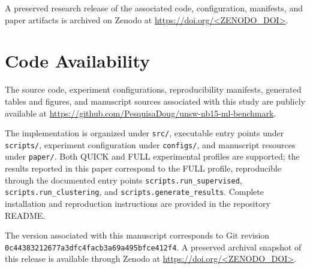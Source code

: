 \documentclass[conference]{IEEEtran}
\begin{document}
A preserved research release of the associated code, configuration, manifests, and paper artifacts is archived on Zenodo at \url{https://doi.org/<ZENODO_DOI>}.

\section{Code Availability}
The source code, experiment configurations, reproducibility manifests, generated tables and figures, and manuscript sources associated with this study are publicly available at \url{https://github.com/PesquisaDoug/unsw-nb15-ml-benchmark}.

The implementation is organized under \texttt{src/}, executable entry points under \texttt{scripts/}, experiment configuration under \texttt{configs/}, and manuscript resources under \texttt{paper/}. Both QUICK and FULL experimental profiles are supported; the results reported in this paper correspond to the FULL profile, reproducible through the documented entry points \texttt{scripts.run\_supervised}, \texttt{scripts.run\_clustering}, and \texttt{scripts.generate\_results}. Complete installation and reproduction instructions are provided in the repository README.

The version associated with this manuscript corresponds to Git revision \texttt{0c44383212677a3dfc4facb3a69a495bfce412f4}. A preserved archival snapshot of this release is available through Zenodo at \url{https://doi.org/<ZENODO_DOI>}.

\FloatBarrier



\end{document}
